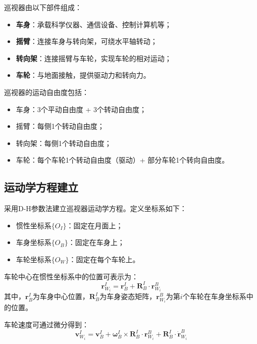 巡视器由以下部件组成：
\begin{itemize}
    \item \textbf{车身}：承载科学仪器、通信设备、控制计算机等；
    \item \textbf{摇臂}：连接车身与转向架，可绕水平轴转动；
    \item \textbf{转向架}：连接摇臂与车轮，实现车轮的相对运动；
    \item \textbf{车轮}：与地面接触，提供驱动力和转向力。
\end{itemize}

巡视器的运动自由度包括：
\begin{itemize}
    \item 车身：3个平动自由度 + 3个转动自由度；
    \item 摇臂：每侧1个转动自由度；
    \item 转向架：每侧1个转动自由度；
    \item 车轮：每个车轮1个转动自由度（驱动）+ 部分车轮1个转向自由度。
\end{itemize}

\subsection{运动学方程建立}
\label{subsec:kinematics}

采用D-H参数法建立巡视器运动学方程。定义坐标系如下：
\begin{itemize}
    \item 惯性坐标系$\{O_I\}$：固定在月面上；
    \item 车身坐标系$\{O_B\}$：固定在车身上；
    \item 车轮坐标系$\{O_W\}$：固定在每个车轮上。
\end{itemize}

车轮中心在惯性坐标系中的位置可表示为：
\begin{equation}
    \mathbf{r}_{W_i}^I = \mathbf{r}_B^I + \mathbf{R}_B^I \cdot \mathbf{r}_{W_i}^B
    \label{eq:wheel_pos}
\end{equation}
其中，$\mathbf{r}_B^I$为车身中心位置，$\mathbf{R}_B^I$为车身姿态矩阵，$\mathbf{r}_{W_i}^B$为第$i$个车轮在车身坐标系中的位置。

车轮速度可通过微分得到：
\begin{equation}
    \mathbf{v}_{W_i}^I = \mathbf{v}_B^I + \boldsymbol{\omega}_B^I \times \mathbf{R}_B^I \cdot \mathbf{r}_{W_i}^B + \mathbf{R}_B^I \cdot \dot{\mathbf{r}}_{W_i}^B
    \label{eq:wheel_vel}
\end{equation}

